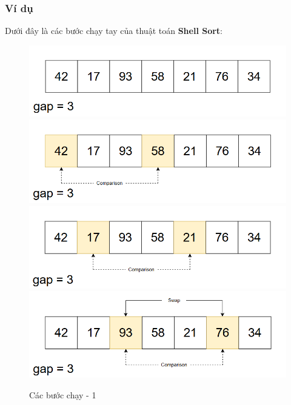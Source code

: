 \subsubsection{Ví dụ}
Dưới đây là các bước chạy tay của thuật toán \textbf{Shell Sort}:
\begin{figure}[H]
    \centering
    \includegraphics[width=1\linewidth]{img/shell_sort/1.png}
    \vspace{0.15cm}
    \includegraphics[width=1\linewidth]{img/shell_sort/2.png}
    \vspace{0.15cm}
    \includegraphics[width=1\linewidth]{img/shell_sort/3.png}
    \vspace{0.15cm}
    \includegraphics[width=1\linewidth]{img/shell_sort/4.png}
    \caption{Các bước chạy - 1}
    \label{fig:part1}
\end{figure}

